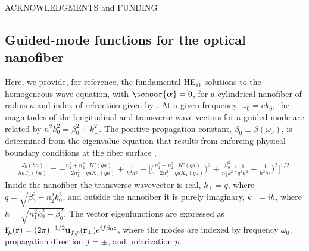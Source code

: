 \documentclass[preprint, aps,pra,onecolumn]{revtex4-1} %
\begin{document}
ACKNOWLEDGMENTS and FUNDING

%
%




\begin{appendix}	


\section{Guided-mode functions for the optical nanofiber} \label{Appendix::ModeFunctions}


Here, we provide, for reference, the fundamental HE$_{11}$ solutions to the homogeneous wave equation,  with $\tensor{\boldsymbol{\alpha}} = 0$, for a cylindrical nanofiber of radius $a$ and index of refraction given by .  At a given frequency, $\omega_0 = c k_0$, the magnitudes of the longitudinal and transverse wave vectors for a guided mode are related by $n^2 k_0^2 = \beta_0^2 + k_\perp^2$.  
The positive propagation constant, $\beta_0 \equiv \beta(\omega_0)$, is determined from the eigenvalue equation that results from enforcing physical boundary conditions at the fiber surface \cite{Yariv, Marcuse, Snyder and Love},
	\begin{align}
		\frac{J_0(ha)}{ha J_1(ha)} = - \frac{n_1^2+n_2^2}{2n_1^2} \frac{K'(qa)}{qa K_1(qa)} + \frac{1}{h^2 a^2} - \bigg[ \bigg(\frac{n_1^2 - n_2^2}{2 n_1^2} \frac{K'(qa)}{qa K_1(qa)} \bigg)^2  + \frac{\beta_0^2}{n^2_1 k^2} \bigg(\frac{1}{q^2a^2} + \frac{1}{h^2a^2} \bigg)^2 \bigg]^{1/2}.
	\end{align}
Inside the nanofiber the transverse wavevector is real, $k_\perp = q$, where $q=\sqrt{\beta_0^2- n_2^2k_0^2}$, and outside the nanofiber it is purely imaginary, $k_\perp = i h$, where $h=\sqrt{n_1^2 k_0^2 - \beta_0^2}$.  The vector eigenfunctions are expressed as $\mathbf{f}_{\mu}(\mathbf{r}) = (2\pi)^{-1/2}\mathbf{u}_{f,p}(\mathbf{r}_\perp) e^{i f \beta_0 z}$, where the modes are indexed by frequency $\omega_0$, propagation direction $f = \pm$, and polarization $p$.


\end{appendix}
\end{document}
